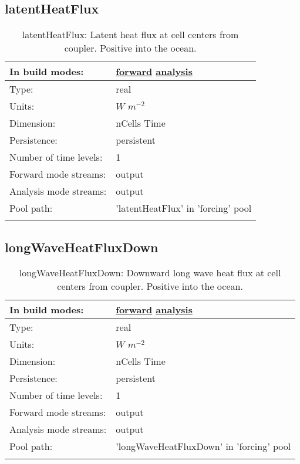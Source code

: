 \subsection[latentHeatFlux]{latentHeatFlux}
\label{subsec:var_sec_forcing_latentHeatFlux}
\begin{center}
\begin{longtable}{| p{2.0in} | p{4.0in} |}
        \hline 
        In build modes: & \hyperref[subsec:forward_var_tab_forcing]{forward} \hyperref[subsec:analysis_var_tab_forcing]{analysis} \\
        \hline 
        Type: & real \\
        \hline 
        Units: & $W$ $m^{-2}$ \\
        \hline 
        Dimension: & nCells Time \\
        \hline 
        Persistence: & persistent \\
        \hline 
        Number of time levels: & 1 \\
        \hline 
		 Forward mode streams: &  output \\
        \hline 
		 Analysis mode streams: &  output \\
        \hline 
            Pool path: & 'latentHeatFlux' in 'forcing' pool
 \\
		 \hline 
    \caption{latentHeatFlux: Latent heat flux at cell centers from coupler. Positive into the ocean.}
\end{longtable}
\end{center}
\subsection[longWaveHeatFluxDown]{longWaveHeatFluxDown}
\label{subsec:var_sec_forcing_longWaveHeatFluxDown}
\begin{center}
\begin{longtable}{| p{2.0in} | p{4.0in} |}
        \hline 
        In build modes: & \hyperref[subsec:forward_var_tab_forcing]{forward} \hyperref[subsec:analysis_var_tab_forcing]{analysis} \\
        \hline 
        Type: & real \\
        \hline 
        Units: & $W$ $m^{-2}$ \\
        \hline 
        Dimension: & nCells Time \\
        \hline 
        Persistence: & persistent \\
        \hline 
        Number of time levels: & 1 \\
        \hline 
		 Forward mode streams: &  output \\
        \hline 
		 Analysis mode streams: &  output \\
        \hline 
            Pool path: & 'longWaveHeatFluxDown' in 'forcing' pool
 \\
		 \hline 
    \caption{longWaveHeatFluxDown: Downward long wave heat flux at cell centers from coupler. Positive into the ocean.}
\end{longtable}
\end{center}

